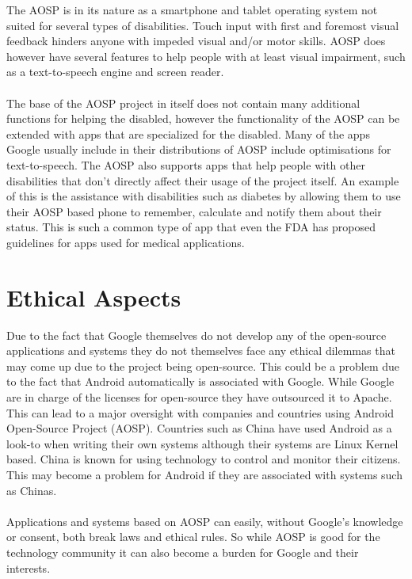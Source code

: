 \documentclass[conference]{IEEEtran}
\begin{document}
The AOSP is in its nature as a smartphone and tablet operating system not suited for several types of disabilities. Touch input with first and foremost visual feedback hinders anyone with impeded visual and/or motor skills. AOSP does however have several features to help people with at least visual impairment, such as a text-to-speech engine and screen reader.\cite{android-disabled-help} 
\\\\The base of the AOSP project in itself does not contain many additional functions for helping the disabled, however the functionality of the AOSP can be extended with apps that are specialized for the disabled.\cite{android-disabled-apps} Many of the apps Google usually include in their distributions of AOSP include optimisations for text-to-speech.\cite{android-disabled-help} The AOSP also supports apps that help people with other disabilities that don't directly affect their usage of the project itself. An example of this is the assistance with disabilities such as diabetes by allowing them to use their AOSP based phone to remember, calculate and notify them about their status.\cite{android-disabled-diabetes} This is such a common type of app that even the FDA has proposed guidelines for apps used for medical applications.\cite{android-disabled-FDA}



\section{Ethical Aspects}
\label{ethics}

Due to the fact that Google themselves do not develop any of the open-source applications and systems they do not themselves face any ethical dilemmas that may come up due to the project being open-source. This could be a problem due to the fact that Android automatically is associated with Google. While Google are in charge of the licenses for open-source they have outsourced it to Apache.\cite{android-licenses} This can lead to a major oversight with companies and countries using Android Open-Source Project (AOSP). Countries such as China have used Android as a look-to when writing their own systems\cite{country-license} although their systems are Linux Kernel based. China is known for using technology to control and monitor their citizens. This may become a problem for Android if they are associated with systems such as Chinas.
\\\\Applications and systems based on AOSP can easily, without Google's knowledge or consent, both break laws and ethical rules. So while AOSP is good for the technology community it can also become a burden for Google and their interests.
\end{document}

